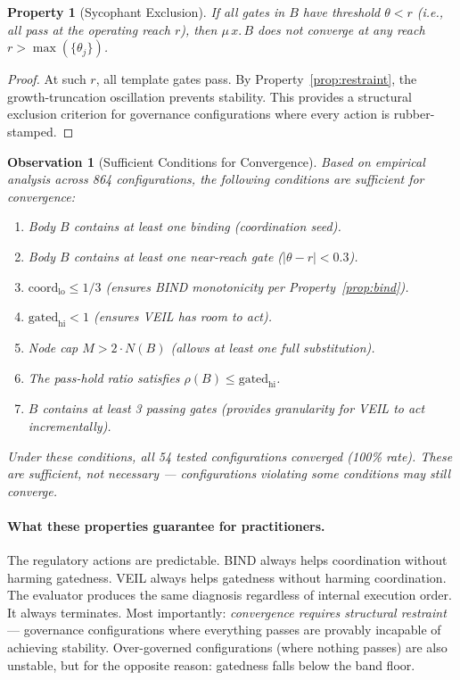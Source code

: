 \documentclass[sigconf,nonacm]{acmart}
\newtheorem{property}{Property}
\newtheorem{observation}{Observation}
\begin{document}
\begin{property}[Sycophant Exclusion]\label{prop:sycophant}
If all gates in $B$ have threshold $\theta < r$ (i.e., all pass at
the operating reach $r$), then $\mu\,x.\,B$ does not converge at
any reach $r > \max(\{\theta_j\})$.
\end{property}
\begin{proof}
At such $r$, all template gates pass. By Property~\ref{prop:restraint},
the growth-truncation oscillation prevents stability. This provides
a structural exclusion criterion for governance configurations where
every action is rubber-stamped.
\end{proof}

\begin{observation}[Sufficient Conditions for Convergence]\label{obs:convergence}
Based on empirical analysis across 864 configurations, the following
conditions are sufficient for convergence:
\begin{enumerate}[label=\textup{H\arabic*},leftmargin=*]
  \item Body $B$ contains at least one binding (coordination seed).
  \item Body $B$ contains at least one near-reach gate
    ($|\theta - r| < 0.3$).
  \item $\mathrm{coord}_{\mathrm{lo}} \leq 1/3$ (ensures BIND
    monotonicity per Property~\ref{prop:bind}).
  \item $\mathrm{gated}_{\mathrm{hi}} < 1$ (ensures VEIL has room
    to act).
  \item Node cap $M > 2 \cdot N(B)$ (allows at least one full
    substitution).
  \item The pass-hold ratio satisfies $\rho(B) \leq
    \mathrm{gated}_{\mathrm{hi}}$.
  \item $B$ contains at least 3 passing gates (provides granularity
    for VEIL to act incrementally).
\end{enumerate}
Under these conditions, all 54 tested configurations converged (100\%
rate). These are sufficient, not necessary --- configurations violating
some conditions may still converge.
\end{observation}

\medskip

\paragraph{What these properties guarantee for practitioners.}
The regulatory actions are predictable. BIND always helps coordination
without harming gatedness. VEIL always helps gatedness without harming
coordination. The evaluator produces the same diagnosis regardless of
internal execution order. It always terminates. Most importantly:
\emph{convergence requires structural restraint} --- governance
configurations where everything passes are provably incapable of
achieving stability. Over-governed configurations (where nothing passes)
are also unstable, but for the opposite reason: gatedness falls below the
band floor.
\end{document}
